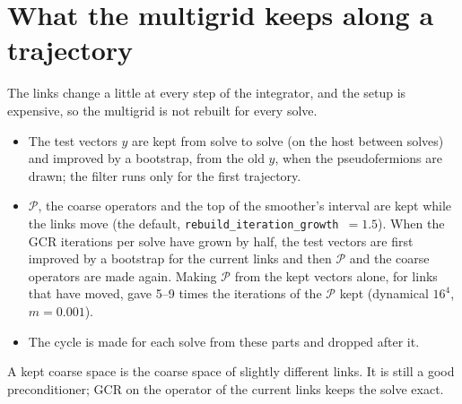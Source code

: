 \documentclass[11pt,a4paper]{article}
\numberwithin{equation}{section}
\newcommand{\Pro}{\mathcal P}
\newcommand{\code}[1]{\texttt{\small #1}}
\begin{document}
\section{What the multigrid keeps along a trajectory}
The links change a little at every step of the integrator, and the setup is expensive, so the
multigrid is not rebuilt for every solve.
\begin{itemize}
\item The test vectors $y$ are kept from solve to solve (on the host between solves) and improved by
a bootstrap, from the old $y$, when the pseudofermions are drawn; the filter runs only for the
first trajectory.
\item $\Pro$, the coarse operators and the top of the smoother's interval are kept while the links
move (the default, \code{rebuild\_iteration\_growth}~$=1.5$). When the GCR iterations per solve
have grown by half, the test vectors are first improved by a bootstrap for the current links and
then $\Pro$ and the coarse operators are made again. Making $\Pro$ from the kept vectors alone,
for links that have moved, gave 5--9 times the iterations of the $\Pro$ kept (dynamical $16^4$,
$m=0.001$).
\item The cycle is made for each solve from these parts and dropped after it.
\end{itemize}
A kept coarse space is the coarse space of slightly different links. It is still a good
preconditioner; GCR on the operator of the current links keeps the solve exact.
\end{document}
